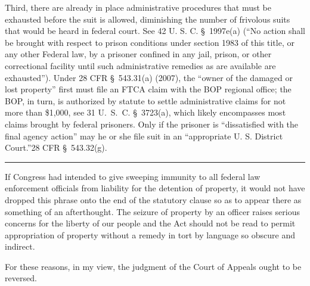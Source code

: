   Third, there are already in place administrative procedures that must be exhausted before the suit is allowed, diminishing the number of frivolous suits that would be heard in federal court. See 42 U. S. C. \S~1997e(a) (``No action shall be brought with respect to prison conditions under section 1983 of this title, or any other Federal law, by a prisoner confined in any jail, prison, or other correctional facility until such administrative remedies as are available are exhausted''). Under 28 CFR \S~543.31(a) (2007), the ``owner of the damaged or lost property'' first must file an FTCA claim with the BOP regional office; the BOP, in turn, is authorized by statute to settle administrative claims for not more than \$1,000, see 31 U.~S.~C. \S~3723(a), which likely encompasses most claims brought by federal prisoners. Only if the prisoner is ``dissatisfied with the final agency action'' may he or she file suit in an ``appropriate U. S. District Court.''28 CFR \S~543.32(g).

\hrule

  If Congress had intended to give sweeping immunity to all federal law enforcement officials from liability for the detention of property, it would not have dropped this phrase onto the end of the statutory clause so as to appear there as something of an afterthought. The seizure of property by an of\newpage ficer raises serious concerns for the liberty of our people and the Act should not be read to permit appropriation of property without a remedy in tort by language so obscure and indirect.

  For these reasons, in my view, the judgment of the Court of Appeals ought to be reversed.
